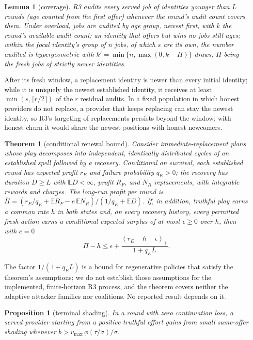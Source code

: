 \documentclass[11pt]{article}
\newtheorem{theorem}{Theorem}\newtheorem{lemma}{Lemma}\newtheorem{corollary}{Corollary}\newtheorem{proposition}{Proposition}
\begin{document}
\begin{lemma}[coverage]\label{lem:coverage}
R3 audits every served job of identities younger than $L$ rounds (age counted from the first offer) whenever the round's audit count covers them. Under overload, jobs are audited by age group, newest first, with $k$ the round's available audit count; an identity that offers but wins no jobs still ages; within the focal identity's group of $n$ jobs, of which $s$ are its own, the number audited is hypergeometric with $k' = \min\{n, \max(0, k - H)\}$ draws, $H$ being the fresh jobs of strictly newer identities.
\end{lemma}

After its fresh window, a replacement identity is newer than every initial identity; while it is uniquely the newest established identity, it receives at least $\min(s, \lceil r/2 \rceil)$ of the $r$ residual audits. In a fixed population in which honest providers do not replace, a provider that keeps replacing can stay the newest identity, so R3's targeting of replacements persists beyond the window; with honest churn it would share the newest positions with honest newcomers.

\begin{theorem}[conditional renewal bound]\label{thm:renewal}
Consider immediate-replacement plans whose play decomposes into independent, identically distributed cycles of an established spell followed by a recovery. Conditional on survival, each established round has expected profit $r_E$ and failure probability $q_E > 0$; the recovery has duration $D \ge L$ with $\mathbb{E}D < \infty$, profit $R_F$, and $N_R$ replacements, with integrable rewards and charges. The long-run profit per round is $\bar\Pi = (r_E/q_E + \mathbb{E}R_F - e\,\mathbb{E}N_R)/(1/q_E + \mathbb{E}D)$. If, in addition, truthful play earns a common rate $h$ in both states and, on every recovery history, every permitted fresh action earns a conditional expected surplus of at most $\epsilon \ge 0$ over $h$, then with $e = 0$
\[ \bar\Pi - h \le \epsilon + \frac{(r_E - h - \epsilon)_+}{1 + q_E L}. \]
\end{theorem}

The factor $1/(1 + q_E L)$ is a bound for regenerative policies that satisfy the theorem's assumptions; we do not establish those assumptions for the implemented, finite-horizon R3 process, and the theorem covers neither the adaptive attacker families nor coalitions. No reported result depends on it.

\begin{proposition}[terminal shading]\label{prop:terminal}
In a round with zero continuation loss, a served provider starting from a positive truthful effort gains from small same-offer shading whenever $b > v_{\max}\,\phi(\tau/\sigma)/\sigma$.
\end{proposition}
\end{document}
